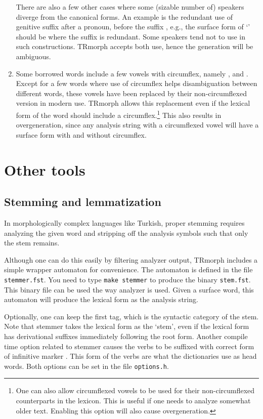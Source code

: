 \documentclass[twocolumn]{article}
\begin{document}
\begin{enumerate}
There are also a few other cases where some (sizable number of)
speakers diverge from the canonical forms. An example is the redundant
use of genitive suffix after a pronoun, before the suffix
, e.g., the surface form of
`' should be  where the
suffix  is redundant. Some speakers tend not to use 
in such constructions. TRmorph accepts both use, hence the generation
will be ambiguous.

\item Some borrowed words include a few vowels with circumflex, namely
,
 and
. Except for a few words where use of circumflex helps
disambiguation between different words, these vowels have been replaced by their
non-circumflexed version in modern use. TRmorph allows this
replacement even if the lexical form of the word should include a
circumflex.\footnote{One can also allow circumflexed vowels
to be used for their non-circumflexed counterparts in the lexicon. This is useful if one needs to
analyze somewhat older text. Enabling this option will also cause
overgeneration.} This also results in overgeneration, since any
analysis string with a circumflexed vowel will have a surface form
with and without circumflex.

\end{enumerate}

\section{\label{sec:other-tools}Other tools}

\subsection{Stemming and lemmatization}

In morphologically complex languages like Turkish, proper stemming
requires analyzing the given word and stripping off the analysis
symbols such that only the stem remains.

Although one can do this easily by filtering analyzer output, TRmorph
includes a simple wrapper automaton for convenience. The
automaton is defined in the file \lstinline{stemmer.fst}. You need to
type \lstinline{make stemmer} to produce the binary
\lstinline{stem.fst}. This binary file can be used the way analyzer is
used. Given a surface word, this automaton will produce the lexical
form as the analysis string.

Optionally, one can keep the first tag, which is the syntactic
category of the stem. Note that stemmer takes the lexical form as the
`stem', even if the lexical form has derivational suffixes immediately
following the root form.
Another compile time option related to stemmer causes the verbs to be
suffixed with correct form of infinitive marker . This form
of the verbs are what the dictionaries use as head words. Both options
can be set in the file \lstinline{options.h}.
\end{document}
